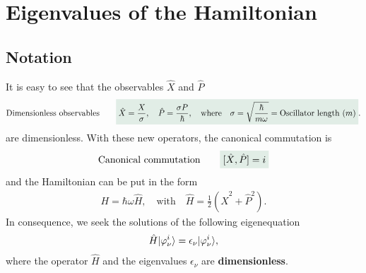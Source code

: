 \section{Eigenvalues of the Hamiltonian}
%
\subsection{Notation}
It is easy to see that the observables $\hat{X}$ and $\hat{P}$ 
\begin{align*}
    \text{Dimensionless observables}\qquad\highlight{\hat{X}=\frac{X}{\sigma},\quad\hat{P}=\frac{\sigma P}{\hbar},\quad\text{where}\quad\sigma=\sqrt{\frac{\hbar}{m\omega}}=\text{Oscillator length $(m)$}}.
\end{align*}
are dimensionless. With these new operators, the canonical commutation is 
\begin{align}
    \text{Canonical commutation}\qquad\highlight{[\hat{X},\hat{P}]=i}
\end{align}
and the Hamiltonian can be put in the form 
\begin{align}
    H=\hbar\omega\hat{H},\quad\text{with}\quad \hat{H}=\frac{1}{2}(\hat{X}^2+\hat{P}^2).
\end{align}
In consequence, we seek the solutions of the following eigenequation
\begin{align*}
    \hat{H}|\varphi_\nu^i\rangle=\epsilon_\nu|\varphi_\nu^i\rangle,
\end{align*}
where the operator $\hat{H}$ and the eigenvalues $\epsilon_\nu$ are \textbf{dimensionless}.

